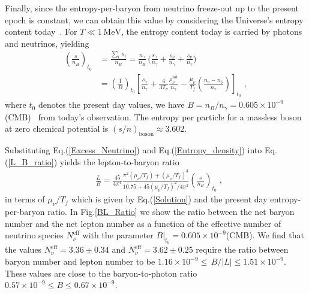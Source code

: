 Finally, since the entropy-per-baryon from neutrino freeze-out up to the present epoch is constant, we can obtain this value by considering the Universe's entropy content today~\cite{Fromerth:2012fe}. For $T\ll1\,\mathrm{MeV}$, the entropy content today is carried by photons and neutrinos, yielding
\begin{align}
\label{Nb_S}
\left(\frac{s}{n_B}\right)_{t_0}&=\frac{\sum_i\,s_i}{n_B}=\frac{n_\gamma}{n_B}\,\bigg(\frac{s_\gamma}{n_\gamma}+\frac{s_\nu}{n_\gamma}+\frac{s_{\bar{\nu}}}{n_\gamma}\bigg)\;\\
&=\left(\frac{1}{B}\right)_{\!\!t_0}\!\!\left[\frac{s_\gamma}{n_\gamma}+\frac{4}{3T_\nu}\frac{\rho_\nu^{\mathrm{tot}}}{n_\gamma}-\frac{\mu_\nu}{T_f}\left(\frac{n_\nu-n_{\bar{\nu}}}{n_\gamma}\right)\right]_{t_0}\;,
\end{align}
where $t_0$ denotes the present day values, we have $B=n_B/n_\gamma= 0.605\times10^{-9}$ (CMB)~\cite{ParticleDataGroup:2016lqr} from today's observation. The entropy per particle for a massless boson at zero chemical potential is $(s/n)_{\mathrm{boson}}\approx 3.602$.

Substituting Eq.\;(\ref{Excess_Neutrino}) and Eq.\;(\ref{Entropy_density}) into Eq.\;(\ref{L_B_ratio}) yields the lepton-to-baryon ratio
\begin{align}\label{L_B_ratio_final}
&\frac{L}{B}=\frac{45}{4\pi^4}\frac{\pi^2(\mu_\nu/T_f)+(\mu_\nu/T_f)^3}{10.75+{45}(\mu_\nu/T_f)^2/{4\pi^2}}\left(\frac{s}{n_B}\right)_{\!\!t_0}\;,
\end{align}
in terms of $\mu_\nu/T_f$ which is given by Eq.(\ref{Solution}) and the present day entropy-per-baryon ratio. In Fig.\;\ref{BL_Ratio} we show the ratio between the net baryon number and the net lepton number as a function of the effective number of neutrino species $N^{\mathrm{eff}}_\nu$ with the parameter $ B|_{t_0} =0.605\times 10^{-9}$(CMB). We find that the values $N_\nu^{\mathrm{eff}}=3.36\pm0.34$ and $N_\nu^{\mathrm{eff}}= 3.62\pm0.25$ require the ratio between baryon number and lepton number to be $1.16 \times 10^{-9} \leqslant\, B/|L| \leqslant 1.51\times 10^{-9}$. These values are close to the baryon-to-photon ratio $0.57 \times 10^{-9} \leqslant B  \leqslant 0.67\times 10^{-9}$. 


